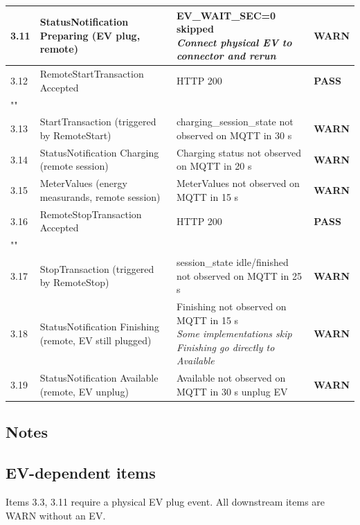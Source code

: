 \documentclass[10pt, a4paper]{article}
\begin{document}
\begin{longtable}{|L{1cm}|L{5.5cm}|M{7cm}|C{1.8cm}|}
\hline
\small 3.11 & \small StatusNotification Preparing (EV plug, remote) & EV\_WAIT\_SEC=0  skipped{\newline\normalfont\footnotesize\itshape Connect physical EV to connector and rerun} & \textcolor{warnorange}{\textbf{WARN}} \\
\hline
\small 3.12 & \small RemoteStartTransaction  Accepted & HTTP 200 & \textcolor{passgreen}{\textbf{PASS}} \\
\hline
{} \\
\hline
\small 3.13 & \small StartTransaction (triggered by RemoteStart) & charging\_session\_state not observed on MQTT in 30 s & \textcolor{warnorange}{\textbf{WARN}} \\
\hline
\small 3.14 & \small StatusNotification Charging (remote session) & Charging status not observed on MQTT in 20 s & \textcolor{warnorange}{\textbf{WARN}} \\
\hline
\small 3.15 & \small MeterValues (energy measurands, remote session) & MeterValues not observed on MQTT in 15 s & \textcolor{warnorange}{\textbf{WARN}} \\
\hline
\small 3.16 & \small RemoteStopTransaction  Accepted & HTTP 200 & \textcolor{passgreen}{\textbf{PASS}} \\
\hline
{} \\
\hline
\small 3.17 & \small StopTransaction (triggered by RemoteStop) & session\_state idle/finished not observed on MQTT in 25 s & \textcolor{warnorange}{\textbf{WARN}} \\
\hline
\small 3.18 & \small StatusNotification Finishing (remote, EV still plugged) & Finishing not observed on MQTT in 15 s{\newline\normalfont\footnotesize\itshape Some implementations skip Finishing  go directly to Available} & \textcolor{warnorange}{\textbf{WARN}} \\
\hline
\small 3.19 & \small StatusNotification Available (remote, EV unplug) & Available not observed on MQTT in 30 s  unplug EV & \textcolor{warnorange}{\textbf{WARN}} \\
\hline
\end{longtable}
\normalsize
\subsection*{Notes}

\subsection*{EV-dependent items}
Items 3.3, 3.11 require a physical EV plug event. All downstream items are WARN without an EV.
\end{document}

